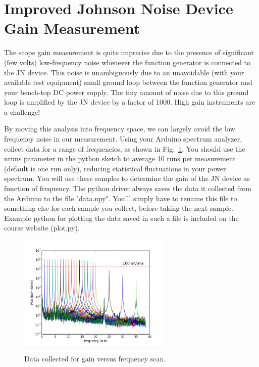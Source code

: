\documentclass[12pt]{article}
\begin{document}
\section{Improved Johnson Noise Device Gain Measurement}

The scope gain measurement is quite imprecise due to the presence of significant (few volts) low-frequency noise whenever the function generator is connected to the JN device.  This noise is unambiguously due to an unavoidable (with your available test equipment) small ground loop between the function generator and your bench-top DC power supply.  The tiny amount of noise due to this ground loop is amplified by the JN device by a factor of 1000.  High gain instruments are a challenge!  

By moving this analysis into frequency space, we can largely avoid the low frequency noise in our measurement.  Using your Arduino spectrum analyzer, collect data for a range of frequencies, as shown in Fig.~\ref{fig:gain_raw}.  You should use the nruns parameter in the python sketch to average 10 runs per measurement (default is one run only), reducing statistical fluctuations in your power spectrum.  You will use these samples to determine the gain of the JN device as function of frequency.  The python driver always saves the data it collected from the Arduino to the file "data.npy".  You'll simply have to rename this file to something else for each sample you collect, before taking the next sample.  Example python for plotting the data saved in such a file is included on the course website (plot.py). 

\begin{figure}[htbp]
\begin{center}
{\includegraphics[width=0.65\textwidth]{figs/gain_raw.png}}
\end{center}
\caption{\label{fig:gain_raw}  Data collected for gain versus frequency scan.}\end{figure}
\end{document}
